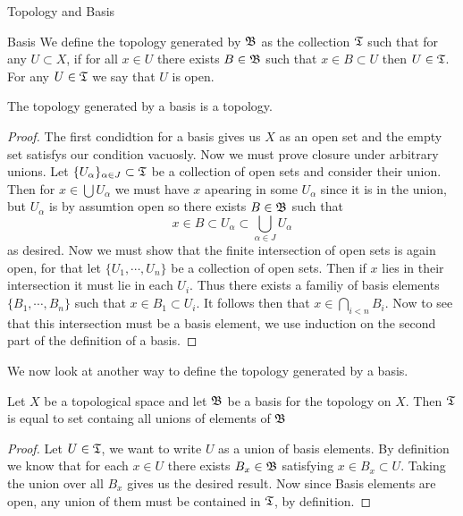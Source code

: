 \begin{chapter}{Topology and Basis}
\begin{defn}{Basis}
        We define the topology generated by $\mathfrak{B}$ as the collection $\mathfrak{T}$ such that for any $U \subset X$, if 
        for all $x \in U$ there exists $B \in \mathfrak{B}$ such that $x \in B \subset U$ then $U \in \mathfrak{T}$. 
        For any $U \in \mathfrak{T}$ we say that $U$ is open. 
    \end{defn}

    
    \begin{prop}
        The topology generated by a basis is a topology. 
    \end{prop}

    
    \begin{proof}
        The first condidtion for a basis gives us $X$ as an open set and the empty set satisfys our condition vacuosly. 
        Now we must prove closure under arbitrary unions. Let $\{U_\alpha\}_{\alpha \in J} \subset \mathfrak{T}$ be a collection of 
        open sets and consider their union. Then for $x \in \bigcup U_\alpha$ we must have $x$ apearing in some $U_\alpha$ since it 
        is in the union, but $U_\alpha $ is by assumtion open so there exists $B \in \mathfrak{B}$ such that 
        \[x \in B \subset U_\alpha \subset \bigcup_{\alpha \in J} U_\alpha\]
        as desired. Now we must show that the finite intersection of open sets is again open, for that let 
        $\{U_1, \dotsb, U_n\}$ be a collection of open sets. Then if $x$ lies in their intersection it must lie in each 
        $U_i$. Thus there exists a familiy of basis elements $\{B_1, \dotsb, B_n\}$ such that $x \in B_1 \subset U_i$. 
        It follows then that $x \in \bigcap_{i < n} B_i$. Now to see that this intersection must be a basis element, we use induction 
        on the second part of the definition of a basis. 
    \end{proof}

    We now look at another way to define the topology generated by a basis. 

    
    \begin{lem}
        Let $X$ be a topological space and let $\mathfrak{B}$ be a basis for the topology on $X$. Then $\mathfrak{T}$ is equal 
        to set containg all unions of elements of $\mathfrak{B}$
    \end{lem}

    
    \begin{proof}
        Let $U \in \mathfrak{T}$, we want to write $U$ as a union of basis elements. By definition we know that for each $x \in U$ there exists $B_x \in \mathfrak{B}$ satisfying 
        $x \in B_x \subset U$. Taking the union over all $B_x$ gives us the desired result. Now since Basis elements are open, any union of them must be contained 
        in $\mathfrak{T}$, by definition. 
    \end{proof}


\end{chapter}
